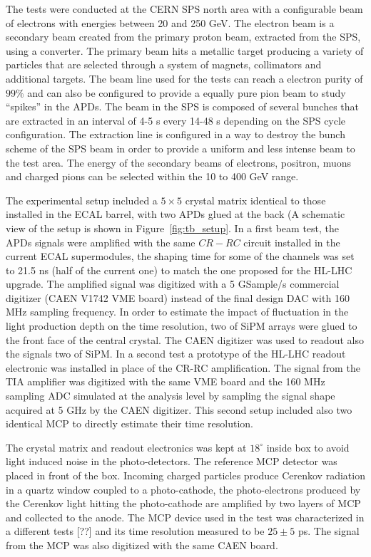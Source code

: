 The tests were conducted at the CERN SPS north area with a configurable beam of electrons with energies between 20 and 250 GeV.
The electron beam is a secondary beam created from the primary proton beam, extracted from the SPS, using a converter.
The primary beam hits a metallic target producing a variety of particles that are selected through a system of magnets, collimators
and additional targets. The beam line used for the tests can reach a electron purity of $99\%$ and can also be
configured to provide a equally pure pion beam to study ``spikes'' in the APDs.
The beam in the SPS is composed of several bunches that are extracted in an interval of 4-5 s every 14-48 s depending on the
SPS cycle configuration. The extraction line is configured in a way to destroy the bunch scheme of the SPS beam in order
to provide a uniform and less intense beam to the test area.
The energy of the secondary beams of electrons, positron, muons and charged pions can be selected within the 10 to 400 GeV
range. 

The experimental setup included a $5\times 5$ \PbWO crystal matrix identical to those installed in the ECAL barrel,
with two APDs glued at the back (A schematic view of the setup is shown in Figure~\ref{fig:tb_setup}.
In a first beam test, the APDs signals were amplified with the same $CR-RC$ circuit installed in the current ECAL
supermodules, the shaping time for some of the channels was set to 21.5 ns (half of the current one) to match the
one proposed for the HL-LHC upgrade.
The amplified signal was digitized with a 5 GSample/s commercial digitizer (CAEN V1742 VME board)
instead of the final design DAC with 160 MHz sampling frequency.
In order to estimate the impact of fluctuation in the light production depth on the time resolution,
two of SiPM arrays were glued to the front face of the central crystal.
The CAEN digitizer was used to readout also the signals two of SiPM.
In a second test a prototype of the HL-LHC readout electronic was installed in place of the
CR-RC amplification. The signal from the TIA amplifier was digitized with the same VME board and the
160 MHz sampling ADC simulated at the analysis level by sampling the signal shape acquired at 5 GHz by the CAEN digitizer.
This second setup included also two identical MCP to directly estimate their time resolution.

The crystal matrix and readout electronics was kept at $18^{\circ}$ inside box to avoid
light induced noise in the photo-detectors. The reference MCP detector was placed in front of the box. 
Incoming charged particles produce Cerenkov radiation in a quartz window coupled to a photo-cathode,
the photo-electrons produced by the Cerenkov light hitting
the photo-cathode are amplified by two layers of MCP and collected to the anode. 
The MCP device used in the test was characterized 
in a different tests [??] and its time resolution measured to be $25\pm5$ ps.
The signal from the MCP was also digitized with the same CAEN board.

